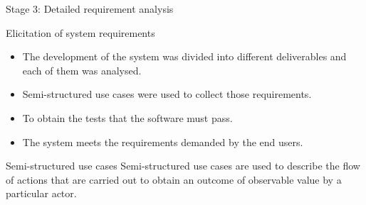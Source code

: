 \documentclass[notes=show, 10pt, xcolor=table]{beamer}
\begin{document}
    \begin{frame}{Stage 3: Detailed requirement analysis }
        \begin{block}{Elicitation of system requirements}
            \begin{itemize}
            	\item The development of the system was divided into different deliverables and each of them was analysed.
            	\item Semi-structured use cases were used to collect those requirements.
            	\item To obtain the tests that the software must pass.
            	\item The system meets the requirements demanded by the end users.
           \end{itemize}	
    \end{block}
	\begin{block}{Semi-structured use cases}
    	Semi-structured use cases are used to describe the flow of actions that are carried out to obtain an outcome of observable value by a particular actor.
    \end{block}
    \end{frame}
    
    
\end{document}
